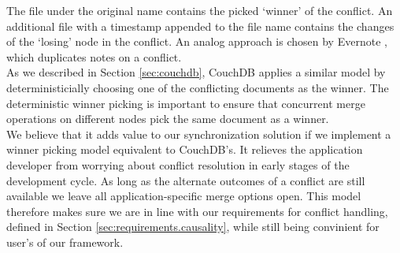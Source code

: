 The file under the original name contains the picked `winner' of the conflict.
An additional file with a timestamp appended to the file name contains the changes of the `losing' node in the conflict.
An analog approach is chosen by Evernote \cite{evernote}, which duplicates notes on a conflict.\\
As we described in Section \ref{sec:couchdb}, CouchDB applies a similar model by deterministicially choosing one of the conflicting documents as the winner.
The deterministic winner picking is important to ensure that concurrent merge operations on different nodes pick the same document as a winner.\\
We believe that it adds value to our synchronization solution if we implement a winner picking model equivalent to CouchDB's.
It relieves the application developer from worrying about conflict resolution in early stages of the development cycle.
As long as the alternate outcomes of a conflict are still available we leave all application-specific merge options open.
This model therefore makes sure we are in line with our requirements for conflict handling, defined in Section \ref{sec:requirements.causality}, while still being convinient for user's of our framework.

